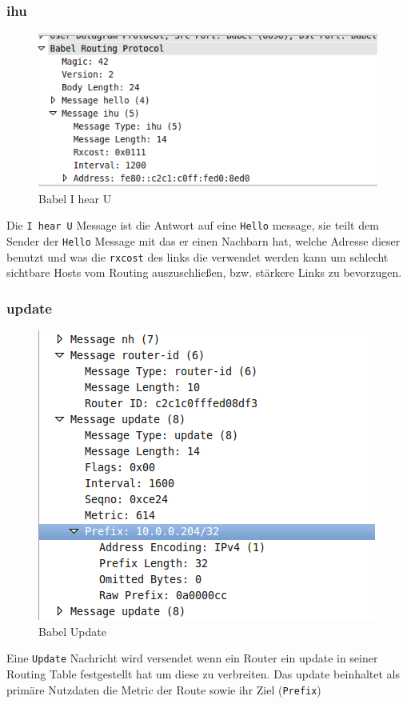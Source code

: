 \documentclass[10pt]{scrartcl}
\begin{document}
	\subsubsection{ihu}
	\begin{figure}[H]
        \centering
                \includegraphics[width=\textwidth]{img/babel_ihu}
        \caption{Babel I hear U}
        \label{img:testAufbau}
	\end{figure}
	Die \verb!I hear U! Message ist die Antwort auf eine \verb!Hello! message, sie teilt dem Sender der \verb!Hello! Message mit das er einen Nachbarn hat, welche Adresse dieser benutzt und was die \verb!rxcost! des links die verwendet werden kann um schlecht sichtbare Hosts vom Routing auszuschließen, bzw. stärkere Links zu bevorzugen.
	
	\subsubsection{update}	
	\begin{figure}[H]
        \centering
                \includegraphics[width=\textwidth]{img/babel_update}
        \caption{Babel Update}
        \label{img:testAufbau}
	\end{figure}
	Eine \verb!Update! Nachricht wird versendet wenn ein Router ein update in seiner Routing Table festgestellt hat um diese zu verbreiten. Das update beinhaltet als primäre Nutzdaten die Metric der Route sowie ihr Ziel (\verb!Prefix!)
	 
\end{document}
